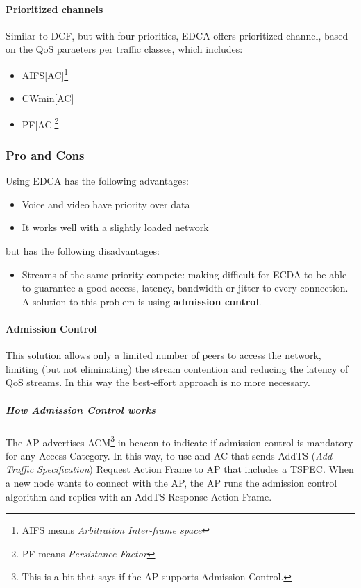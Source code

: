 \paragraph*{Prioritized channels} Similar to DCF, but with four priorities, EDCA
offers prioritized channel, based on the QoS paraeters per traffic classes,
which includes:
\begin{itemize}
\item AIFS[AC]\footnote{AIFS means \textit{Arbitration Inter-frame space}}
\item CWmin[AC]
\item PF[AC]\footnote{PF means \textit{Persistance Factor}}
\end{itemize}

\subsubsection{Pro and Cons}

Using EDCA has the following advantages:
\begin{itemize}
\item Voice and video have priority over data
\item It works well with a slightly loaded network
\end{itemize}
but has the following disadvantages:
\begin{itemize}
\item Streams of the same priority compete: making difficult for ECDA to be able
  to guarantee a good access, latency, bandwidth or jitter to every connection.
A solution to this problem is using \textbf{admission control}.
\end{itemize}

\paragraph*{Admission Control} This solution allows only a limited number of
peers to access the network, limiting (but not eliminating) the stream
contention and reducing the latency of QoS streams.
In this way the best-effort approach is no more necessary.
\subparagraph*{How Admission Control works} The AP advertises ACM\footnote{This
is a bit that says if the AP supports Admission Control.} in beacon to indicate
if admission control is mandatory for any Access Category. In this way, to use
and AC that  sends AddTS (\textit{Add Traffic Specification}) Request Action
Frame to AP that includes a TSPEC.
When a new node wants to connect with the AP, the AP runs the admission control
algorithm and replies with an AddTS Response Action Frame.

